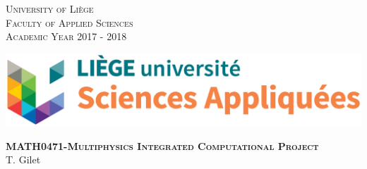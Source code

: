 \documentclass[12 pt]{report}
\begin{document}
\begin{titlepage}
    \vspace{-1cm}
    
    \begin{minipage}{0.6\textwidth}
        \begin{flushleft}
            \centering
            \textsc{University of Liège} \\
            \textsc{Faculty of Applied Sciences} \\
            \textsc{Academic Year 2017 - 2018}
        \end{flushleft}
    \end{minipage}

    \vspace{-2.6cm}
    \hspace{0.5\textwidth}
    
    \begin{minipage}[t]{\textwidth}
        \begin{flushright}
            \includegraphics[scale = 1.2]{uLIEGE_Faculte_SciencesAppliquees_Logo_CMJN_pos}
        \end{flushright}
    \end{minipage}

    \vspace{1cm}


    \begin{minipage}{\textwidth}
        \hspace{-0.7cm}\noindent\makebox[\linewidth]{\rule{\textwidth}{2pt}} 
    \end{minipage}

    \vspace{1cm}

    \begin{minipage}{\textwidth}
        \begin{center}
           \hspace{-0.8cm}\Huge{\textsc{\textbf{MATH0471-Multiphysics Integrated Computational Project}}}\\
            \vspace{0.3cm}
            \hspace{-0.8cm}\Large{T. Gilet} \\
        \end{center}
    \end{minipage}


\end{titlepage}
\end{document}
